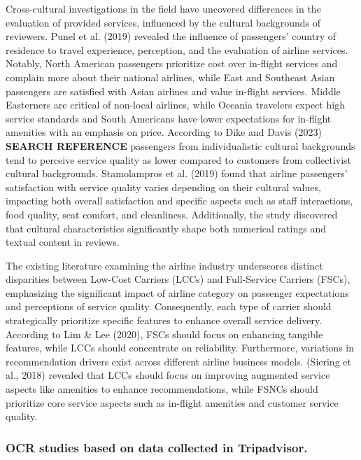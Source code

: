 \documentclass[
]{agujournal2019}
\begin{document}
Cross-cultural investigations in the field have uncovered differences in
the evaluation of provided services, influenced by the cultural
backgrounds of reviewers. Punel et al. (2019) revealed the influence of
passengers' country of residence to travel experience, perception, and
the evaluation of airline services. Notably, North American passengers
prioritize cost over in-flight services and complain more about their
national airlines, while East and Southeast Asian passengers are
satisfied with Asian airlines and value in-flight services. Middle
Easterners are critical of non-local airlines, while Oceania travelers
expect high service standards and South Americans have lower
expectations for in-flight amenities with an emphasis on price.
According to Dike and Davis (2023) \textbf{SEARCH REFERENCE} passengers
from individualistic cultural backgrounds tend to perceive service
quality as lower compared to customers from collectivist cultural
backgrounds. Stamolampros et al. (2019) found that airline passengers'
satisfaction with service quality varies depending on their cultural
values, impacting both overall satisfaction and specific aspects such as
staff interactions, food quality, seat comfort, and cleanliness.
Additionally, the study discovered that cultural characteristics
significantly shape both numerical ratings and textual content in
reviews.

The existing literature examining the airline industry underscores
distinct disparities between Low-Cost Carriers (LCCs) and Full-Service
Carriers (FSCs), emphasizing the significant impact of airline category
on passenger expectations and perceptions of service quality.
Consequently, each type of carrier should strategically prioritize
specific features to enhance overall service delivery. According to Lim
\& Lee (2020), FSCs should focus on enhancing tangible features, while
LCCs should concentrate on reliability. Furthermore, variations in
recommendation drivers exist across different airline business models.
(Siering et al., 2018) revealed that LCCs should focus on improving
augmented service aspects like amenities to enhance recommendations,
while FSNCs should prioritize core service aspects such as in-flight
amenities and customer service quality.

\subsubsection{OCR studies based on data collected in
Tripadvisor.}\label{ocr-studies-based-on-data-collected-in-tripadvisor.}
\end{document}
